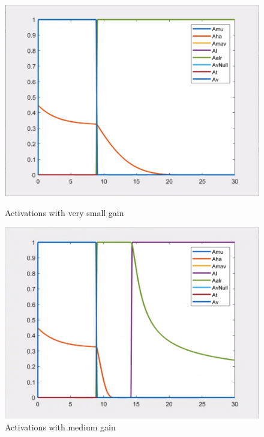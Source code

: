 \documentclass{article}
\begin{document}
\begin{figure}[htpb] 
\begin{minipage}{0.40\textwidth}  
\includegraphics[width=\textwidth]{313_s_Activation.png}
\caption{Activations with very small gain}\label{act_w_s} 
\end{minipage}  
\hspace{0.2\textwidth} 
\begin{minipage}{0.40\textwidth}  
\includegraphics[width=\textwidth]{313_m_Activation.png}
\caption{Activations with medium gain}\label{act_w_m} 
\end{minipage} 
\hspace{0.2\textwidth} 
\begin{minipage}{0.40\textwidth}  

\end{minipage}
\end{figure}
\end{document}
